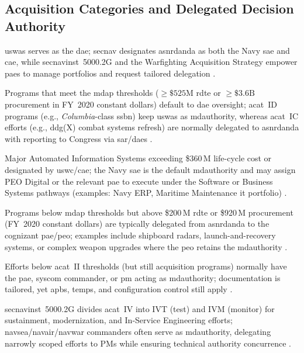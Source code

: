 \documentclass[../main.tex]{subfiles}
\begin{document}
\subsection{Acquisition Categories and Delegated Decision Authority}
\ac{uswas} serves as the \ac{dae}; \ac{secnav} designates \ac{asnrdanda} as both the Navy \ac{sae} and \ac{cae}, while \ac{secnavinst}~5000.2G and the Warfighting Acquisition Strategy empower \acp{pae} to manage portfolios and request tailored delegation \autocite{DoDD5000-01,SECNAV5000-2G,secwar-acq-transformation-2025}.
\begin{description}[style=nextline,labelsep=0.5em,font=\bfseries]
\item[\ac{acat}~I (\ac{mdap}).] Programs that meet the \ac{mdap} thresholds ($\geq\$525\text{M}$ \ac{rdte} or $\geq\$3.6\text{B}$ procurement in FY~2020 constant dollars) default to \ac{dae} oversight; \ac{acat}~ID programs (e.g., \textit{Columbia}-class \ac{ssbn}) keep \ac{uswas} as \ac{mdauthority}, whereas \ac{acat}~IC efforts (e.g., \ac{ddg}(X) combat systems refresh) are normally delegated to \ac{asnrdanda} with reporting to Congress via \ac{sar}/\ac{daes} \autocite{USC-10-4201,DoDI5000-85,edo-3-3-1-acq-policy-players-2025}.
\item[\ac{acat}~IA.] Major Automated Information Systems exceeding \$360\,M life-cycle cost or designated by \ac{uswc}/\ac{cae}; the Navy \ac{sae} is the default \ac{mdauthority} and may assign PEO Digital or the relevant \ac{pae} to execute under the Software or Business Systems pathways (examples: Navy ERP, Maritime Maintenance \ac{it} portfolio) \autocite{DoDI5000-02,DoDI5000-75}.
\item[\ac{acat}~II.] Programs below \ac{mdap} thresholds but above \$200\,M \ac{rdte} or \$920\,M procurement (FY~2020 constant dollars) are typically delegated from \ac{asnrdanda} to the cognizant \ac{pae}/\ac{peo}; examples include shipboard radars, launch-and-recovery systems, or complex weapon upgrades where the \ac{peo} retains the \ac{mdauthority} \autocite{DoDI5000-85,edo-3-3-1-acq-policy-players-2025}.
\item[\ac{acat}~III.] Efforts below \ac{acat}~II thresholds (but still acquisition programs) normally have the \ac{pae}, \ac{syscom} commander, or \ac{pm} acting as \ac{mdauthority}; documentation is tailored, yet \acp{apb}, \acp{temp}, and configuration control still apply \autocite{DoDI5000-85,SECNAV5000-2G}.
\item[\ac{acat}~IV (\ac{don} unique).] \ac{secnavinst}~5000.2G divides \ac{acat}~IV into IVT (test) and IVM (monitor) for sustainment, modernization, and In-Service Engineering efforts; \ac{navsea}/\ac{navair}/\ac{navwar} commanders often serve as \ac{mdauthority}, delegating narrowly scoped efforts to PMs while ensuring technical authority concurrence \autocite{SECNAV5000-2G}.
\end{description}
\end{document}
